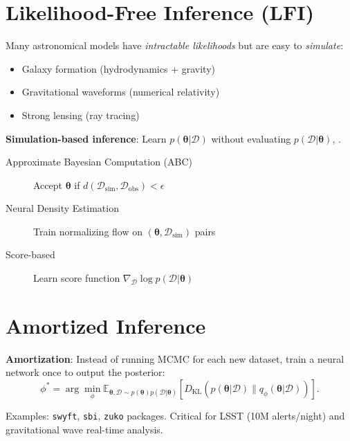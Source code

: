 \section{Likelihood-Free Inference (LFI)}
\label{sec:astro:lfi}

Many astronomical models have \emph{intractable likelihoods} but are easy to \emph{simulate}:
\begin{itemize}
    \item Galaxy formation (hydrodynamics + gravity)
    \item Gravitational waveforms (numerical relativity)
    \item Strong lensing (ray tracing)
\end{itemize}

\textbf{Simulation-based inference}: Learn $p(\bm{\theta}|\mathcal{D})$ without evaluating $p(\mathcal{D}|\bm{\theta})$, \cite{desouza2025astronomy}.

\begin{description}
    \item[Approximate Bayesian Computation (ABC)] Accept $\bm{\theta}$ if $d(\mathcal{D}_{\text{sim}}, \mathcal{D}_{\text{obs}}) < \epsilon$ \cite{desouza2025astronomy}
    \item[Neural Density Estimation] Train normalizing flow on $(\bm{\theta}, \mathcal{D}_{\text{sim}})$ pairs
    \item[Score-based] Learn score function $\nabla_{\mathcal{D}} \log p(\mathcal{D}|\bm{\theta})$
\end{description}

\section{Amortized Inference}
\label{sec:astro:amortized}

\textbf{Amortization}: Instead of running MCMC for each new dataset, train a neural network once to output the posterior:
\[
\phi^* = \arg\min_\phi \mathbb{E}_{\bm{\theta}, \mathcal{D} \sim p(\bm{\theta})p(\mathcal{D}|\bm{\theta})} \left[ D_{\text{KL}}(p(\bm{\theta}|\mathcal{D}) \| q_\phi(\bm{\theta}|\mathcal{D})) \right].
\]

Examples: \texttt{swyft}, \texttt{sbi}, \texttt{zuko} packages. Critical for LSST (10M alerts/night) and gravitational wave real-time analysis.

